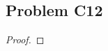\documentclass[../../../main.tex]{subfiles}
\begin{document}
\subsection{Problem C12}
\begin{wts}

\end{wts}
\begin{proof}

\end{proof}
\end{document}
